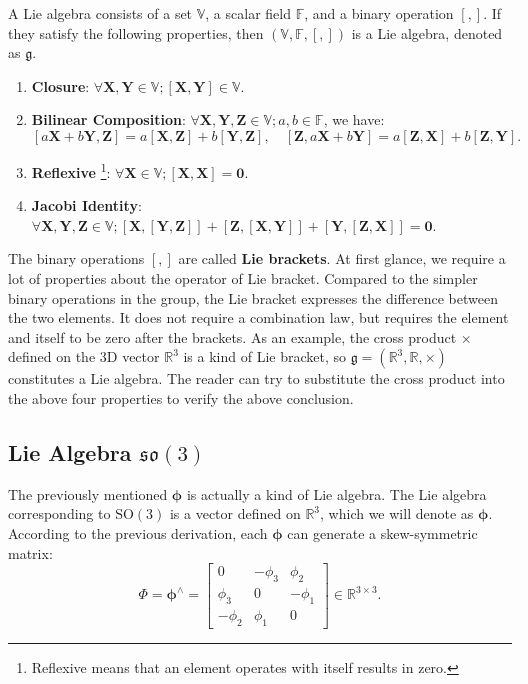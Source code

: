 A Lie algebra consists of a set $\mathbb{V}$, a scalar field $\mathbb{F}$, and a binary operation $[,]$. If they satisfy the following properties, then $(\mathbb{V}, \mathbb{F}, [,])$ is a Lie algebra, denoted as $\mathfrak{g}$.

\begin{enumerate}
    \item \textbf{Closure}: $\forall \mathbf{X}, \mathbf{Y} \in \mathbb{V}; [\mathbf{X}, \mathbf{Y}] \in \mathbb{V}$.
    \item \textbf{Bilinear Composition}: $\forall \mathbf{X},\mathbf{Y},\mathbf{Z} \in \mathbb{V}; a,b \in \mathbb{F }$, we have:
    \[
    [a\mathbf{X}+b\mathbf{Y}, \mathbf{Z}] = a[\mathbf{X}, \mathbf{Z}] + b [ \mathbf{Y}, \mathbf{Z} ], \quad [\mathbf{Z}, a \mathbf{X}+b\mathbf{Y}] = a [\mathbf{Z}, \mathbf{X} ]+ b [\mathbf{Z},\mathbf{Y}] .
    \]
    \item \textbf{Reflexive} \footnote{ Reflexive means that an element operates with itself results in zero. }: $\forall \mathbf{X} \in \mathbb{V}; [\mathbf{X},\mathbf{X}] = \mathbf{0}$.
    \item \textbf{Jacobi Identity}: $\forall \mathbf{X},\mathbf{Y},\mathbf{Z} \in \mathbb{V}; [\mathbf{X}, [ \mathbf{Y},\mathbf{Z}] ] + [\mathbf{Z}, [\mathbf{X},\mathbf{Y}] ] + [\mathbf{Y}, [\mathbf{Z}, \mathbf{X}]] =\mathbf{0}$.
\end{enumerate}
The binary operations $[,]$ are called \textbf{Lie brackets}. At first glance, we require a lot of properties about the operator of Lie bracket.  Compared to the simpler binary operations in the group, the Lie bracket expresses the difference between the two elements. It does not require a combination law, but requires the element and itself to be zero after the brackets. As an example, the cross product $\times$ defined on the 3D vector $\mathbb{R}^3$ is a kind of Lie bracket, so $\mathfrak{g} = (\mathbb{R}^3, \mathbb{R}, \times)$ constitutes a Lie algebra. The reader can try to substitute the cross product into the above four properties to verify the above conclusion.

\subsection{Lie Algebra $\mathfrak{so}(3)$}
The previously mentioned $\boldsymbol{\phi}$ is actually a kind of Lie algebra. The Lie algebra corresponding to $\mathrm{SO}(3)$ is a vector defined on $\mathbb{R}^3$, which we will denote as $\boldsymbol{\phi}$. According to the previous derivation, each $\boldsymbol{\phi}$ can generate a skew-symmetric matrix:
\begin{equation}
\label{eq:phi}
\boldsymbol{\varPhi} = \boldsymbol{\phi}^{\wedge} = \left[ {\begin{array}{*{20}{c}}
    0&{ - {\phi _3}}&{{\phi _2}}\\
    {{\phi _3}}&0&{ - {\phi _1}}\\
    { - {\phi _2}}&{{\phi _1}}&0
    \end{array}} \right] \in \mathbb{R}^{3 \times 3}.
\end{equation}

